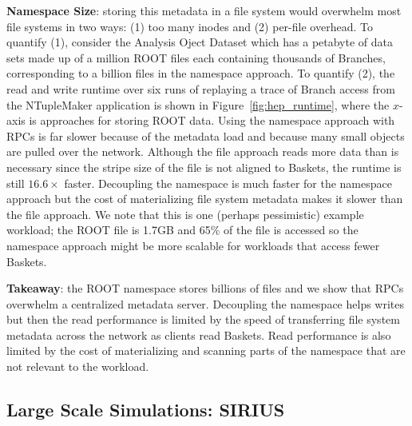 \textbf{Namespace Size}: storing this metadata in a file system would overwhelm
most file systems in two ways: (1) too many inodes and (2) per-file overhead.
To quantify (1), consider the Analysis Oject Dataset which has a petabyte of
data sets made up of a million ROOT files each containing thousands of
Branches, corresponding to a billion files in the namespace approach.  To
quantify (2), the read and write runtime over six runs of replaying a trace of
Branch access from the NTupleMaker application is shown in
Figure~\ref{fig:hep_runtime}, where the \(x\)-axis is approaches for storing
ROOT data.  Using the namespace approach with RPCs is far slower because of the
metadata load and because many small objects are pulled over the network.
Although the file approach reads more data than is necessary since the stripe
size of the file is not aligned to Baskets, the runtime is still \(16.6\times\)
faster. Decoupling the namespace is much faster for the namespace approach but
the cost of materializing file system metadata makes it slower than the file
approach.  We note that this is one (perhaps pessimistic) example workload; the
ROOT file is 1.7GB and 65\% of the file is accessed so the namespace approach
might be more scalable for workloads that access fewer Baskets.


\textbf{Takeaway}: the ROOT namespace stores billions of files and we show that
RPCs overwhelm a centralized metadata server. Decoupling the namespace helps
writes but then the read performance is limited by the speed of transferring
file system metadata across the network as clients read Baskets.  Read
performance is also limited by the cost of materializing and scanning parts of
the namespace that are not relevant to the workload.

\vspace{-0.5em}
\subsection{Large Scale Simulations: SIRIUS}
\vspace{-0.5em}

